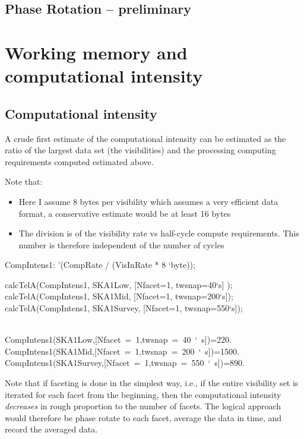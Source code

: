 \documentclass[useAMS,usenatbib,referee]{article}
\begin{document}
\subsection{Phase Rotation -- preliminary}

\section{Working memory and computational intensity}

\subsection{Computational intensity}

A crude first estimate of the computational intensity can be estimated
as the ratio of the largest data set (the visibilities) and the
processing computing requirements computed estimated above.

Note that: 
\begin{itemize}
\item Here I assume 8 bytes per visibility which assumes a very
  efficient data format, a conservative estimate would be at least 16
  bytes
\item The division is of the visibility rate vs half-cycle compute
  requirements. This number is therefore independent of the number of
  cycles
\end{itemize}

\begin{maxima}[]
CompIntens1: '(CompRate /  (VisInRate * 8 `byte));

calcTelA(CompIntens1, SKA1Low, [Nfacet=1, twsnap=40`s] );
calcTelA(CompIntens1, SKA1Mid, [Nfacet=1, twsnap=200`s]);
calcTelA(CompIntens1, SKA1Survey, [Nfacet=1, twsnap=550`s]);

\maximaoutput*
{} \\
\m  \mbox{{}CompIntens1(SKA1Low,[Nfacet = 1,twsnap = 40 ` s]){}}=220. \\
\m  \mbox{{}CompIntens1(SKA1Mid,[Nfacet = 1,twsnap = 200 ` s]){}}=1500. \\
\m  \mbox{{}CompIntens1(SKA1Survey,[Nfacet = 1,twsnap = 550 ` s]){}}=890. \\
\end{maxima}

Note that if faceting is done in the simplest way, i.e., if the entire
visibility set is iterated for each facet from the beginning, then the
computational intensity \emph{decreases} in rough proportion to the
number of facets. The logical approach would therefore be phase rotate
to each facet, average the data in time, and record the averaged data. 
\end{document}
